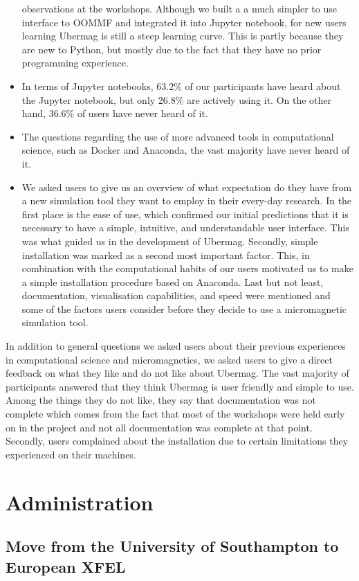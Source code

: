 \documentclass{deliverablereport}
\begin{document}
\begin{itemize}
observations at the workshops. Although we built a a much simpler to
use interface to OOMMF and integrated it into Jupyter notebook, for
new users learning Ubermag is still a steep learning curve. This is
partly because they are new to Python, but mostly due to the fact that
they have no prior programming experience.
\item In terms of Jupyter notebooks, 63.2\% of our participants have
heard about the Jupyter notebook, but only 26.8\% are actively using
it. On the other hand, 36.6\% of users have never heard of it.
\item The questions regarding the use of more advanced tools in
computational science, such as Docker and Anaconda, the vast majority
have never heard of it.
  \item We asked users to give us an overview of what expectation do
they have from a new simulation tool they want to employ in their
every-day research. In the first place is the ease of use, which
confirmed our initial predictions that it is necessary to have a
simple, intuitive, and understandable user interface. This was what
guided us in the development of Ubermag. Secondly, simple installation
was marked as a second most important factor. This, in combination
with the computational habits of our users motivated us to make a
simple installation procedure based on Anaconda. Last but not least,
documentation, visualisation capabilities, and speed were mentioned
and some of the factors users consider before they decide to use a
micromagnetic simulation tool.
\end{itemize}

In addition to general questions we asked users about their previous
experiences in computational science and micromagnetics, we asked
users to give a direct feedback on what they like and do not like
about Ubermag. The vast majority of participants answered that they
think Ubermag is user friendly and simple to use. Among the things
they do not like, they say that documentation was not complete which
comes from the fact that most of the workshops were held early on in
the project and not all documentation was complete at that
point. Secondly, users complained about the installation due to
certain limitations they experienced on their machines.

\section{Administration}

\subsection{Move from the University of Southampton to European XFEL}
\end{document}
